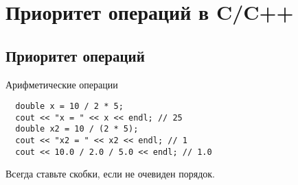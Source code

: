 \section{Приоритет операций в C/C++}

\subsection{Приоритет операций}

\begin{frame}[t,fragile]{Арифметические операции}

\begin{lstlisting}
  double x = 10 / 2 * 5;
  cout << "x = " << x << endl; // 25
  double x2 = 10 / (2 * 5);
  cout << "x2 = " << x2 << endl; // 1
  cout << 10.0 / 2.0 / 5.0 << endl; // 1.0
\end{lstlisting}

Всегда ставьте скобки, если не очевиден порядок.
 
\end{frame}
